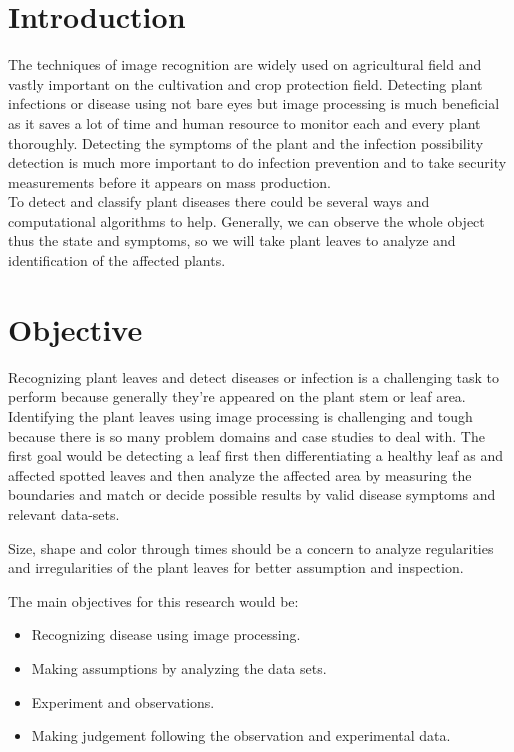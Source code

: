 \documentclass[conference]{IEEEtran}
\begin{document}
\section{Introduction}
\large
 The techniques of image recognition are widely used on agricultural field and vastly important on the cultivation and crop protection field. Detecting plant infections or disease using not bare eyes but image processing is much beneficial as it saves a lot of time and human resource to monitor each and every plant thoroughly. Detecting the symptoms of the plant and the infection possibility detection is much more important to do infection prevention and to take security measurements before it appears on mass production.
\\
To detect and classify plant diseases there could be several ways and computational algorithms to help. Generally, we can observe the whole object thus the state and symptoms, so we will take plant leaves to analyze and identification of the affected plants.   



\section{Objective}
\large Recognizing plant leaves and detect diseases or infection is a challenging task to perform because generally they’re appeared on the plant stem or leaf area. Identifying the plant leaves using image processing is challenging and tough because there is so many problem domains and case studies to deal with. The first goal would be detecting a leaf first then differentiating a healthy leaf as and affected spotted leaves and then analyze the affected area by measuring the boundaries and match or decide possible results by valid disease symptoms and relevant data-sets.

Size, shape and color through times should be a concern to analyze regularities and irregularities of the plant leaves for better assumption and inspection.

The main objectives for this research would be:

\begin{itemize}
    \item	Recognizing disease using image processing.
    \item Making assumptions by analyzing the data sets.
    \item Experiment and observations.
    \item Making judgement following the observation and experimental data.
\end{itemize}
\end{document}
